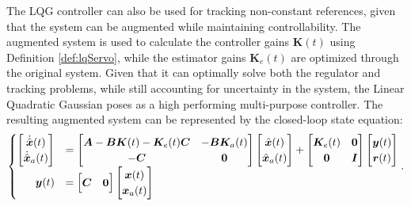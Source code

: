 \documentclass[a4paper,11pt]{book}
\numberwithin{figure}{chapter}
\numberwithin{equation}{chapter}
\numberwithin{table}{chapter}
\theoremstyle{definition}
\begin{document}
The LQG controller can also be used for tracking non-constant references, given that the system can be augmented while maintaining controllability. The augmented system is used to calculate the controller gains $\bm{K}(t)$ using Definition \ref{def:lqServo}, while the estimator gains $\bm{K}_e(t)$ are optimized through the original system. Given that it can optimally solve both the regulator and tracking problems, while still accounting for uncertainty in the system, the Linear Quadratic Gaussian poses as a high performing multi-purpose controller. The resulting augmented system can be represented by the closed-loop state equation:
\begin{align}
\begin{cases}
        \begin{bmatrix}
            \dot{\hat{\bm{x}}}(t) \\
            \dot{\hat{\bm{x}}}_a(t)
        \end{bmatrix} &= \begin{bmatrix}
            \bm{A} - \bm{B} \bm{K}(t) - \bm{K}_e(t) \bm{C} & -\bm{B} \bm{K}_a(t) \\ - \bm{C} & \bm{0}
        \end{bmatrix} \begin{bmatrix}
            \hat{\bm{x}}(t) \\
            \hat{\bm{x}}_a(t)
        \end{bmatrix} + \begin{bmatrix}
            \bm{K}_e(t) & \bm{0}  \\
            \bm{0} & \bm{I} 
        \end{bmatrix} \begin{bmatrix}
	        \bm{y}(t) \\ \bm{r}(t)
        \end{bmatrix} \\
        \hfill \bm{y}(t) &= \begin{bmatrix}
            \bm{C} & \bm{0}
        \end{bmatrix} \begin{bmatrix}
            \bm{x}(t) \\
            \bm{x}_a(t)
        \end{bmatrix}
    \end{cases}
.\end{align}
\end{document}

